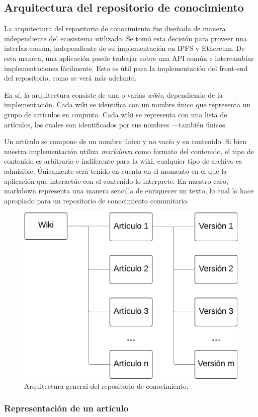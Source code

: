 \subsection{Arquitectura del repositorio de conocimiento}

La arquitectura del repositorio de conocimiento fue diseñada de manera independiente del ecosistema utilizado. Se tomó esta decisión para proveer una interfaz común, independiente de su implementación en IPFS y Ethereum. De esta manera, una aplicación puede trabajar sobre una API común e intercambiar implementaciones fácilmente. Esto es útil para la implementación del front-end del repositorio, como se verá más adelante.

En sí, la arquitectura consiste de una o varias \textit{wikis}, dependiendo de la implementación. Cada wiki se identifica con un nombre único que representa un grupo de artículos en conjunto. Cada wiki se representa con una lista de artículos, los cuales son identificados por sus nombres —también únicos. 

Un artículo se compone de un nombre único y no vacío y su contenido. Si bien nuestra implementación utiliza \textit{markdown} \cite{markdown} como formato del contenido, el tipo de contenido es arbitrario e indiferente para la wiki, cualquier tipo de archivo es admisible. Únicamente será tenido en cuenta en el momento en el que la aplicación que interactúe con el contenido lo interprete. En nuestro caso, markdown representa una manera sencilla de enriquecer un texto, lo cual lo hace apropiado para un repositorio de conocimiento comunitario.

\begin{figure}[H]
    \centering
    \includegraphics[width=0.5\linewidth]{img/solucion-wiki/arquitectura-wiki.png}
    \caption{Arquitectura general del repositorio de conocimiento.}
    \label{fig:architecture-wiki}
\end{figure}

\subsubsection{Representación de un artículo}

